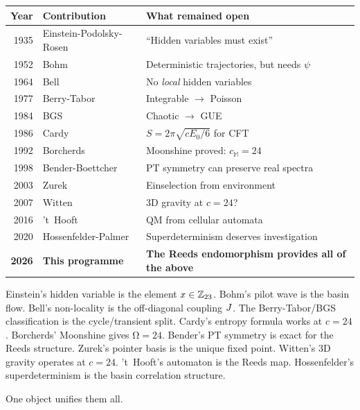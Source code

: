 \documentclass[12pt,a4paper]{article}
\theoremstyle{definition}\newtheorem{definition}[theorem]{Definition}
\theoremstyle{remark}\newtheorem{remark}[theorem]{Remark}
\renewcommand{\O}{\mathrm{\Omega}}
\newcommand{\Monster}{\mathbb{M}}\newcommand{\Leech}{\Lambda_{24}}
\begin{document}
\begin{center}
\begin{tabular}{rll}
\toprule
\textbf{Year} & \textbf{Contribution} & \textbf{What remained open} \\
\midrule
1935 & Einstein-Podolsky-Rosen \cite{epr1935} & ``Hidden variables must exist'' \\
1952 & Bohm \cite{bohm1952} & Deterministic trajectories, but needs $\psi$ \\
1964 & Bell \cite{bell1964} & No \emph{local} hidden variables \\
1977 & Berry-Tabor \cite{berry_tabor1977} & Integrable $\to$ Poisson \\
1984 & BGS \cite{bgs1984} & Chaotic $\to$ GUE \\
1986 & Cardy \cite{cardy1986} & $S = 2\pi\sqrt{cE_0/6}$ for CFT \\
1992 & Borcherds \cite{borcherds1992} & Moonshine proved: $c_\Monster = 24$ \\
1998 & Bender-Boettcher \cite{bender1998} & PT symmetry can preserve real spectra \\
2003 & Zurek \cite{zurek2003} & Einselection from environment \\
2007 & Witten \cite{witten2007} & 3D gravity at $c = 24$? \\
2016 & 't~Hooft \cite{thooft2016} & QM from cellular automata \\
2020 & Hossenfelder-Palmer \cite{hossenfelder2020} & Superdeterminism deserves investigation \\
\midrule
\textbf{2026} & \textbf{This programme} & \textbf{The Reeds endomorphism provides all of the above} \\
\bottomrule
\end{tabular}
\end{center}

Einstein's hidden variable is the element $x \in \mathbb{Z}_{23}$. Bohm's pilot wave is the
basin flow. Bell's non-locality is the off-diagonal coupling $J$. The
Berry-Tabor/BGS classification is the cycle/transient split. Cardy's entropy
formula works at $c = 24$. Borcherds' Moonshine gives $\O = 24$. Bender's PT
symmetry is exact for the Reeds structure. Zurek's pointer basis is the unique
fixed point. Witten's 3D gravity operates at $c = 24$. 't~Hooft's automaton is
the Reeds map. Hossenfelder's superdeterminism is the basin correlation structure.

One object unifies them all.

\end{document}
